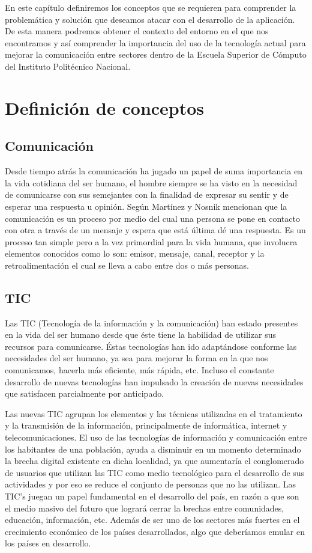 
En este capítulo definiremos los conceptos que se requieren para comprender la problemática y solución que deseamos atacar con el desarrollo de la aplicación. De esta manera podremos obtener el contexto del entorno en el que nos encontramos y así comprender la importancia del uso de la tecnología actual para mejorar la comunicación entre sectores dentro de la  Escuela Superior de Cómputo del Instituto Politécnico Nacional.


\section{Definición de conceptos}
	\subsection{Comunicación}
	Desde tiempo atrás la comunicación ha jugado un papel de suma importancia en la vida cotidiana del ser humano, el hombre siempre se ha visto en la necesidad de comunicarse con sus semejantes con la finalidad de expresar su sentir y de esperar una respuesta u opinión. Según Martínez y Nosnik mencionan que la comunicación es un proceso por medio del cual una persona se pone en contacto con otra a través de un mensaje y espera que está última dé una respuesta\cite{01}. Es un proceso tan simple pero a la vez primordial para la vida humana, que involucra elementos conocidos como lo son: emisor, mensaje, canal, receptor y la retroalimentación el cual se lleva a cabo entre dos o más personas.\\

	\subsection{TIC}
	Las TIC (Tecnología de la información y la comunicación) han estado presentes en la vida del ser humano desde que éste tiene la habilidad de utilizar sus recursos para comunicarse. Éstas tecnologías han ido adaptándose conforme las necesidades del ser humano, ya sea para mejorar la forma en la que nos comunicamos, hacerla más eficiente, más rápida, etc. Incluso el constante desarrollo de nuevas tecnologías han impulsado la creación de nuevas necesidades que satisfacen parcialmente por anticipado.
	 
	Las nuevas TIC agrupan los elementos y las técnicas utilizadas en el tratamiento y la transmisión de la información, principalmente de informática, internet y telecomunicaciones. El uso de las tecnologías de información y comunicación entre los habitantes de una población, ayuda a disminuir en un momento determinado la brecha digital existente en dicha localidad, ya que aumentaría el conglomerado de usuarios que utilizan las TIC como medio tecnológico para el desarrollo de sus actividades y por eso se reduce el conjunto de personas que no las utilizan. Las TIC's juegan un papel fundamental en el desarrollo del país, en razón a que son el medio masivo del futuro que logrará cerrar la brechas entre comunidades, educación, información, etc. Además de ser uno de los sectores más fuertes en el crecimiento económico de los países desarrollados, algo que deberíamos emular en los países en desarrollo\cite{02}.
	
